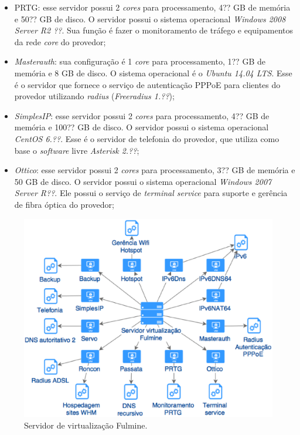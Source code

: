 \begin{itemize}
 \item \ac{PRTG}: esse servidor possui 2 \textit{cores} para processamento, 4?? GB de memória e 50?? GB de disco. O servidor possui o sistema 
 operacional \textit{Windows 2008 Server R2 ??}. Sua função é fazer o monitoramento de tráfego e equipamentos da rede \textit{core} do provedor;
 
 \item \textit{Masterauth}: sua configuração é 1 \textit{core} para processamento, 1?? GB de memória e 8 GB de disco. O sistema operacional é o 
 \textit{Ubuntu 14.04 \ac{LTS}}. Esse é o servidor que fornece o serviço de autenticação \ac{PPPoE} para clientes do provedor utilizando 
 \textit{radius} (\textit{Freeradius 1.??});
 
 \item \textit{SimplesIP}: esse servidor possui 2 \textit{cores} para processamento, 4?? GB de memória e 100?? GB de disco. O servidor possui 
 o sistema operacional \textit{CentOS 6.??}. Esse é o servidor de telefonia do provedor, que utiliza como base o \textit{software} livre 
 \textit{Asterisk 2.??};
 
 \item \textit{Ottico}: esse servidor possui 2 \textit{cores} para processamento, 3?? GB de memória e 50 GB de disco. O servidor possui o sistema 
 operacional \textit{Windows 2007 Server R??}. Ele possui o serviço de \textit{terminal service} para suporte e gerência de fibra óptica do 
 provedor;
\end{itemize}

\begin{figure}[h!]
 \centering
 \includegraphics[width=430px]{img/servlog2.eps}
 \caption{Servidor de virtualização Fulmine.}
 \label{fig:servlog2}
\end{figure}

